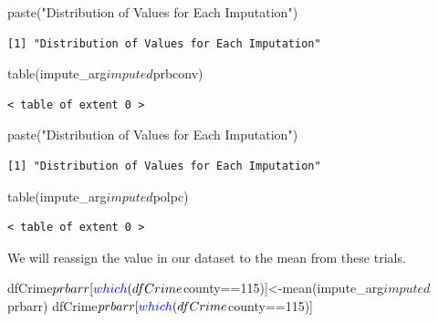 \documentclass[]{article}
\newenvironment{Shaded}{}{}
\newcommand{\DecValTok}[1]{#1}
\newcommand{\KeywordTok}[1]{\textcolor[rgb]{0.00,0.00,1.00}{#1}}
\newcommand{\NormalTok}[1]{#1}
\newcommand{\OperatorTok}[1]{#1}
\newcommand{\StringTok}[1]{\textcolor[rgb]{0.00,0.50,0.50}{#1}}
\begin{document}
\begin{Shaded}
\begin{Highlighting}[]
\KeywordTok{paste}\NormalTok{(}\StringTok{"Distribution of Values for Each Imputation"}\NormalTok{)}
\end{Highlighting}
\end{Shaded}

\begin{verbatim}
[1] "Distribution of Values for Each Imputation"
\end{verbatim}

\begin{Shaded}
\begin{Highlighting}[]
\KeywordTok{table}\NormalTok{(impute_arg}\OperatorTok{$}\NormalTok{imputed}\OperatorTok{$}\NormalTok{prbconv)}
\end{Highlighting}
\end{Shaded}

\begin{verbatim}
< table of extent 0 >
\end{verbatim}

\begin{Shaded}
\begin{Highlighting}[]
\KeywordTok{paste}\NormalTok{(}\StringTok{"Distribution of Values for Each Imputation"}\NormalTok{)}
\end{Highlighting}
\end{Shaded}

\begin{verbatim}
[1] "Distribution of Values for Each Imputation"
\end{verbatim}

\begin{Shaded}
\begin{Highlighting}[]
\KeywordTok{table}\NormalTok{(impute_arg}\OperatorTok{$}\NormalTok{imputed}\OperatorTok{$}\NormalTok{polpc)}
\end{Highlighting}
\end{Shaded}

\begin{verbatim}
< table of extent 0 >
\end{verbatim}

We will reassign the value in our dataset to the mean from these trials.

\begin{Shaded}
\begin{Highlighting}[]
\NormalTok{dfCrime}\OperatorTok{$}\NormalTok{prbarr[}\KeywordTok{which}\NormalTok{(dfCrime}\OperatorTok{$}\NormalTok{county}\OperatorTok{==}\DecValTok{115}\NormalTok{)]<-}\KeywordTok{mean}\NormalTok{(impute_arg}\OperatorTok{$}\NormalTok{imputed}\OperatorTok{$}\NormalTok{prbarr)}
\NormalTok{dfCrime}\OperatorTok{$}\NormalTok{prbarr[}\KeywordTok{which}\NormalTok{(dfCrime}\OperatorTok{$}\NormalTok{county}\OperatorTok{==}\DecValTok{115}\NormalTok{)]}
\end{Highlighting}
\end{Shaded}
\end{document}
